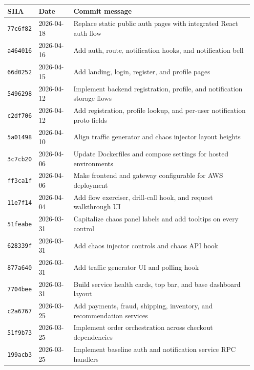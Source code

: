 \documentclass[11pt,letterpaper]{article}
\newcommand{\subhead}[1]{%
  \par\vspace{6pt}{\bfseries\color{InkBlack}#1}\par\vspace{2pt}
}
\begin{document}
\subhead{Commit log (16 commits on \texttt{main})}
\small
\begin{tabular}{@{}lll@{}}
\toprule
\textbf{SHA} & \textbf{Date} & \textbf{Commit message} \\
\midrule
\texttt{77c6f82} & 2026-04-18 & Replace static public auth pages with integrated React auth flow \\
\texttt{a464016} & 2026-04-16 & Add auth, route, notification hooks, and notification bell \\
\texttt{66d0252} & 2026-04-15 & Add landing, login, register, and profile pages \\
\texttt{5496298} & 2026-04-12 & Implement backend registration, profile, and notification storage flows \\
\texttt{c2df706} & 2026-04-12 & Add registration, profile lookup, and per-user notification proto fields \\
\texttt{5a01498} & 2026-04-10 & Align traffic generator and chaos injector layout heights \\
\texttt{3c7cb20} & 2026-04-06 & Update Dockerfiles and compose settings for hosted environments \\
\texttt{ff3ca1f} & 2026-04-06 & Make frontend and gateway configurable for AWS deployment \\
\texttt{11e7f14} & 2026-04-04 & Add flow exerciser, drill-call hook, and request walkthrough UI \\
\texttt{51feabe} & 2026-03-31 & Capitalize chaos panel labels and add tooltips on every control \\
\texttt{628339f} & 2026-03-31 & Add chaos injector controls and chaos API hook \\
\texttt{877a640} & 2026-03-31 & Add traffic generator UI and polling hook \\
\texttt{7704bee} & 2026-03-31 & Build service health cards, top bar, and base dashboard layout \\
\texttt{c2a6767} & 2026-03-25 & Add payments, fraud, shipping, inventory, and recommendation services \\
\texttt{51f9b73} & 2026-03-25 & Implement order orchestration across checkout dependencies \\
\texttt{199acb3} & 2026-03-25 & Implement baseline auth and notification service RPC handlers \\
\bottomrule
\end{tabular}
\normalsize
\end{document}
